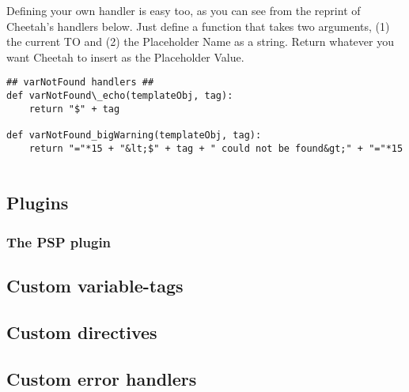 Defining your own handler is easy too, as you can see from the reprint of
Cheetah's handlers below.  Just define a function that takes two arguments, 
(1) the current TO and (2) the Placeholder Name as a string.  Return whatever
you want Cheetah to insert as the Placeholder Value.

\begin{verbatim}
## varNotFound handlers ##
def varNotFound\_echo(templateObj, tag):
    return "$" + tag

def varNotFound_bigWarning(templateObj, tag):
    return "="*15 + "&lt;$" + tag + " could not be found&gt;" + "="*15
    
\end{verbatim}




\subsection{Plugins}
\subsubsection{The PSP plugin}

\subsection{Custom variable-tags}

\subsection{Custom directives}

\subsection{Custom error handlers}


